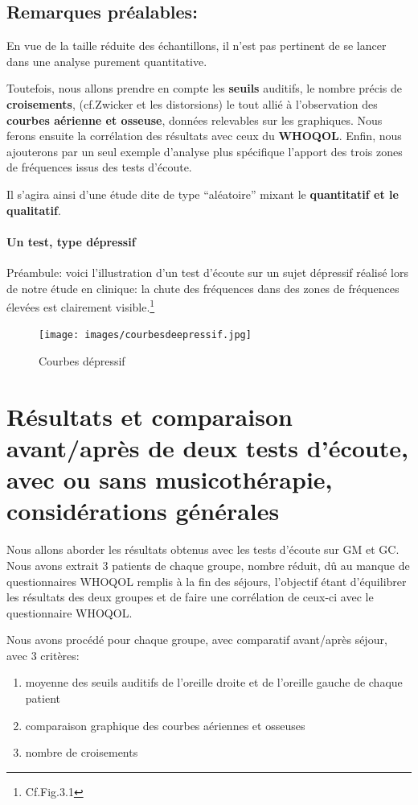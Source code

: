 \subsection{Remarques préalables: }
En vue de la taille réduite des échantillons, il n'est pas
pertinent de se lancer dans une analyse purement
quantitative.

Toutefois, nous 
allons prendre en compte les \textbf{seuils} auditifs, le nombre précis de
\textbf{croisements}, (cf.Zwicker et les distorsions)
 le tout allié à l'observation 
des \textbf{courbes aérienne et osseuse}, 
données relevables sur les
graphiques.
Nous ferons ensuite la corrélation des résultats avec ceux du\textbf{ WHOQOL}.
Enfin, nous ajouterons par un seul exemple d'analyse plus spécifique l'apport des trois zones de fréquences issus des tests d'écoute.

Il s'agira  ainsi d'une étude dite de type  ``aléatoire'' mixant le \textbf{quantitatif  et le qualitatif}.


\paragraph{Un test, type dépressif}

Préambule: voici l'illustration d'un test
d'écoute sur un sujet dépressif réalisé lors de notre
étude en clinique: la
chute des fréquences dans des zones de fréquences élevées est
clairement visible.\footnote{Cf.Fig.3.1}
 \begin{figure}
	\centering
	\texttt{[image: images/courbesdeepressif.jpg]}
	\caption{Courbes dépressif}
	\label{fig:courbes du dépressif}
      \end{figure}


\section{Résultats et comparaison avant/après de deux tests d'écoute, avec ou sans
  musicothérapie, considérations générales}
Nous allons aborder les résultats obtenus avec les tests d'écoute sur
GM et GC.
Nous avons extrait 3 patients de chaque groupe, nombre réduit, dû au
manque de questionnaires WHOQOL remplis à la fin des séjours, l'objectif
étant d'équilibrer les résultats des deux groupes et de faire une corrélation de ceux-ci avec le questionnaire
WHOQOL.

Nous avons procédé pour chaque groupe, avec comparatif avant/après
séjour, avec 3 critères:
\begin{enumerate}
 \item  moyenne des seuils
auditifs de l'oreille droite et de l'oreille gauche de chaque patient

\item comparaison graphique des courbes aériennes et osseuses

\item  nombre de croisements
\end{enumerate}

